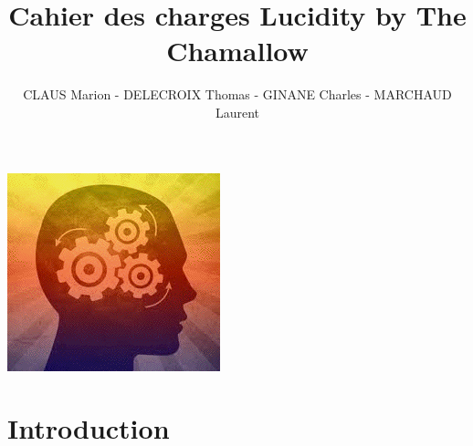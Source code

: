 \documentclass[a4paper]{article}
\begin{document}
\large
\begin{titlepage}
		\title{Cahier des charges Lucidity by The Chamallow}

		\author{ CLAUS Marion -  DELECROIX Thomas - GINANE Charles - MARCHAUD Laurent	} 

		
\end{titlepage}


\pagestyle{fancy}
\renewcommand{\footrulewidth}{0.4pt}


 \begin{titlepage}
\centering
\maketitle
\includegraphics[scale=2.25]{engrenage.png}

  \end{titlepage}


\quad
\quad

\tableofcontents

\newpage

\section{Introduction}
\end{document}
